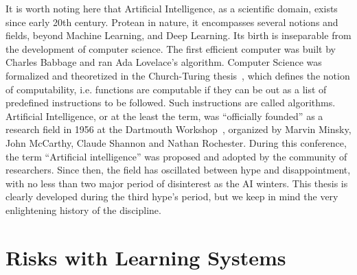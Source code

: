 It is worth noting here that Artificial Intelligence, as a scientific domain, exists since early 20th century. Protean in nature, it encompasses several notions and fields, beyond Machine Learning, and Deep Learning.  Its birth is inseparable from the development of computer science. The first efficient computer was built by Charles Babbage and ran Ada Lovelace's algorithm.  Computer Science was formalized and theoretized in the Church-Turing thesis~\citep{turing1950computing}, which defines the notion of computability, i.e. functions are computable if they can be out as a list of predefined instructions to be followed. Such instructions are called algorithms. Artificial Intelligence, or at the least the term,  was  ``officially founded'' as a research field in 1956 at the Dartmouth Workshop~\citep{mccarthy2006proposal}, organized by Marvin Minsky, John McCarthy, Claude Shannon and Nathan Rochester. During this conference, the term ``Artificial intelligence'' was proposed and adopted by the community of researchers. Since then, the field has oscillated between hype and disappointment, with no less than two major period of disinterest  as the AI winters. This thesis is clearly developed during the third hype's period, but we keep in mind the very enlightening  history of the discipline.  




\section{Risks with Learning Systems}





